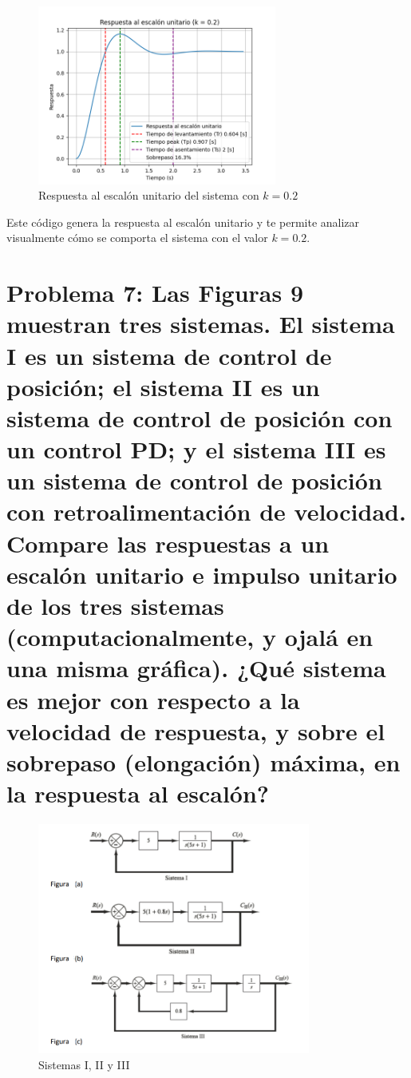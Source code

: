 \documentclass[10pt]{article}
\theoremstyle{definition}
\theoremstyle{remark}
\theoremstyle{definition}
\numberwithin{equation}{prob}
\begin{document}
\begin{figure}[h]
	\centering
	\includegraphics[width=0.7\textwidth]{./figures/Figura 8 ejercicio 6.png}
	\caption{Respuesta al escalón unitario del sistema con \(k = 0.2\)}
\end{figure}


Este código genera la respuesta al escalón unitario y te permite analizar visualmente cómo se comporta el sistema con el valor \(k = 0.2\).

\section{Problema 7: Las Figuras 9 muestran tres sistemas. El sistema I es un sistema de control de posición; el
  sistema II es un sistema de control de posición con un control PD; y el sistema III es un sistema
  de control de posición con retroalimentación de velocidad.
  Compare las respuestas a un escalón unitario e impulso unitario de los tres sistemas (computacionalmente, y ojalá en una misma gráfica). ¿Qué sistema es mejor con respecto a la velocidad
  de respuesta, y sobre el sobrepaso (elongación) máxima, en la respuesta al escalón? }

\begin{figure}[h]
	\centering
	\includegraphics[width=0.8\textwidth]{./figures/Figura 9 ejercicio 7.png}
	\caption{Sistemas I, II y III}
\end{figure}
\end{document}
